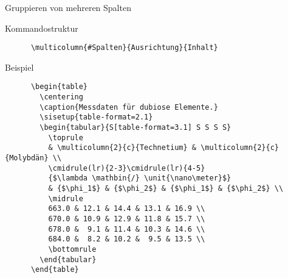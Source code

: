 \begin{frame}[fragile]{Gruppieren von mehreren Spalten}
  \begin{block}{Kommandostruktur}
    \begin{verbatim}
      \multicolumn{#Spalten}{Ausrichtung}{Inhalt}
    \end{verbatim}
  \end{block}
  \fontsize{8}{6}
  \begin{block}{Beispiel}
    \begin{verbatim}
      \begin{table}
        \centering
        \caption{Messdaten für dubiose Elemente.}
        \sisetup{table-format=2.1}
        \begin{tabular}{S[table-format=3.1] S S S S}
          \toprule
          & \multicolumn{2}{c}{Technetium} & \multicolumn{2}{c}{Molybdän} \\
          \cmidrule(lr){2-3}\cmidrule(lr){4-5}
          {$\lambda \mathbin{/} \unit{\nano\meter}$}
          & {$\phi_1$} & {$\phi_2$} & {$\phi_1$} & {$\phi_2$} \\
          \midrule
          663.0 & 12.1 & 14.4 & 13.1 & 16.9 \\
          670.0 & 10.9 & 12.9 & 11.8 & 15.7 \\
          678.0 &  9.1 & 11.4 & 10.3 & 14.6 \\
          684.0 &  8.2 & 10.2 &  9.5 & 13.5 \\
          \bottomrule
        \end{tabular}
      \end{table}
    \end{verbatim}
  \end{block}
\end{frame}

